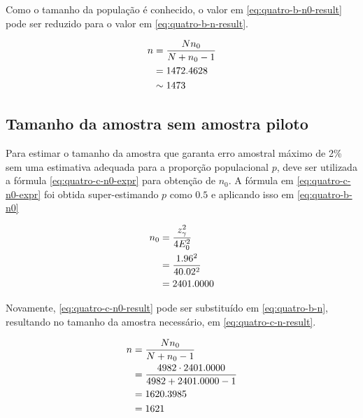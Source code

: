 Como o tamanho da população é conhecido, o valor em \eqref{eq:quatro-b-n0-result} pode ser reduzido para o valor em \eqref{eq:quatro-b-n-result}.

\begin{align}
	n &= \frac{N n_0}{N + n_0 - 1} \nonumber \\
    &= 1472.4628 \nonumber \\
	  &\sim \label{eq:quatro-b-n-result} 
	     1473
\end{align}

\subsection{Tamanho da amostra sem amostra piloto}

Para estimar o tamanho da amostra que garanta erro amostral máximo de 2\% sem uma estimativa adequada para a proporção populacional $p$, deve ser utilizada a fórmula \eqref{eq:quatro-c-n0-expr} para obtenção de $n_0$. A fórmula em \eqref{eq:quatro-c-n0-expr} foi obtida super-estimando $p$ como $0.5$ e aplicando isso em \eqref{eq:quatro-b-n0}

\begin{align}
	n_0 &= \label{eq:quatro-c-n0-expr}
	       \frac{z_\gamma^2}{4 E_0^2} \\
	    &= \frac{1.96^2}{4 0.02^2} \nonumber \\
	    &= \label{eq:quatro-c-n0-result}
	       2401.0000
\end{align}

Novamente, \eqref{eq:quatro-c-n0-result} pode ser substituído em \eqref{eq:quatro-b-n}, resultando no tamanho da amostra necessário, em \eqref{eq:quatro-c-n-result}.

\begin{align}
	n &= \frac{N n_0}{N + n_0 - 1} \nonumber \\
	  &= \frac{4982 \cdot 2401.0000}{4982 + 2401.0000 - 1} \nonumber \\
	  &= 1620.3985 \nonumber \\
	  &= \label{eq:quatro-c-n-result} 
	     1621
\end{align}
